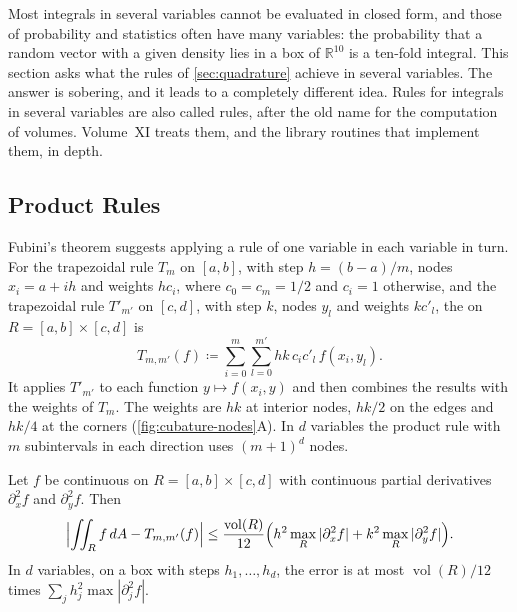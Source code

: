 Most integrals in several variables cannot be evaluated in closed form, and those of probability and statistics often have many variables: the probability that a random vector with a given density lies in a box of $\mathbb R^{10}$ is a ten-fold integral. This section asks what the rules of \cref{sec:quadrature} achieve in several variables. The answer is sobering, and it leads to a completely different idea. Rules for integrals in several variables are also called  rules, after the old name for the computation of volumes. Volume~XI treats them, and the library routines that implement them, in depth.

\subsection{Product Rules}

Fubini's theorem suggests applying a rule of one variable in each variable in turn. For the trapezoidal rule $T_m$ on $[a,b]$, with step $h=(b-a)/m$, nodes $x_i=a+ih$ and weights $hc_i$, where $c_0=c_m=1/2$ and $c_i=1$ otherwise, and the trapezoidal rule $T'_{m'}$ on $[c,d]$, with step $k$, nodes $y_l$ and weights $kc'_l$, the  on $R=[a,b]\times[c,d]$ is
\[
T_{m,m'}(f)\coloneqq\sum_{i=0}^m\sum_{l=0}^{m'}hk\,c_ic'_l\,f(x_i,y_l).
\]
It applies $T'_{m'}$ to each function $y\mapsto f(x_i,y)$ and then combines the results with the weights of $T_m$. The weights are $hk$ at interior nodes, $hk/2$ on the edges and $hk/4$ at the corners (\cref{fig:cubature-nodes}A). In $d$ variables the product rule with $m$ subintervals in each direction uses $(m+1)^d$ nodes.

\begin{proposition}
\label{prop:product-trapezoid-error}
Let $f$ be continuous on $R=[a,b]\times[c,d]$ with continuous partial derivatives $\partial_x^2f$ and $\partial_y^2f$. Then
\[
\Bigl|\iint_Rf\,dA-T_{m,m'}(f)\Bigr|\le\frac{\operatorname{vol}(R)}{12}\Bigl(h^2\max_R|\partial_x^2f|+k^2\max_R|\partial_y^2f|\Bigr).
\]
In $d$ variables, on a box with steps $h_1,\ldots,h_d$, the error is at most $\operatorname{vol}(R)/12$ times $\sum_jh_j^2\max|\partial_j^2f|$.
\end{proposition}

